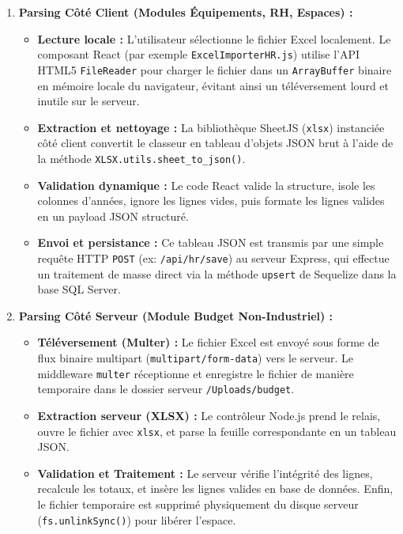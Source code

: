 \begin{enumerate}
    \item \textbf{Parsing Côté Client (Modules Équipements, RH, Espaces) :}
    \begin{itemize}
        \item \textbf{Lecture locale :} L'utilisateur sélectionne le fichier Excel localement. Le composant React (par exemple \texttt{ExcelImporterHR.js}) utilise l'API HTML5 \texttt{FileReader} pour charger le fichier dans un \texttt{ArrayBuffer} binaire en mémoire locale du navigateur, évitant ainsi un téléversement lourd et inutile sur le serveur.
        \item \textbf{Extraction et nettoyage :} La bibliothèque SheetJS (\texttt{xlsx}) instanciée côté client convertit le classeur en tableau d'objets JSON brut à l'aide de la méthode \texttt{XLSX.utils.sheet\_to\_json()}.
        \item \textbf{Validation dynamique :} Le code React valide la structure, isole les colonnes d'années, ignore les lignes vides, puis formate les lignes valides en un payload JSON structuré.
        \item \textbf{Envoi et persistance :} Ce tableau JSON est transmis par une simple requête HTTP \texttt{POST} (ex: \texttt{/api/hr/save}) au serveur Express, qui effectue un traitement de masse direct via la méthode \texttt{upsert} de Sequelize dans la base SQL Server.
    \end{itemize}
    \item \textbf{Parsing Côté Serveur (Module Budget Non-Industriel) :}
    \begin{itemize}
        \item \textbf{Téléversement (Multer) :} Le fichier Excel est envoyé sous forme de flux binaire multipart (\texttt{multipart/form-data}) vers le serveur. Le middleware \texttt{multer} réceptionne et enregistre le fichier de manière temporaire dans le dossier serveur \texttt{/Uploads/budget}.
        \item \textbf{Extraction serveur (XLSX) :} Le contrôleur Node.js prend le relais, ouvre le fichier avec \texttt{xlsx}, et parse la feuille correspondante en un tableau JSON.
        \item \textbf{Validation et Traitement :} Le serveur vérifie l'intégrité des lignes, recalcule les totaux, et insère les lignes valides en base de données. Enfin, le fichier temporaire est supprimé physiquement du disque serveur (\texttt{fs.unlinkSync()}) pour libérer l'espace.
    \end{itemize}
\end{enumerate}

